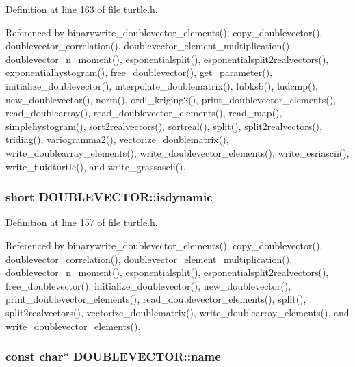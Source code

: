 Definition at line 163 of file turtle.\-h.



Referenced by binarywrite\-\_\-doublevector\-\_\-elements(), copy\-\_\-doublevector(), doublevector\-\_\-correlation(), doublevector\-\_\-element\-\_\-multiplication(), doublevector\-\_\-n\-\_\-moment(), esponentialsplit(), esponentialsplit2realvectors(), exponentialhystogram(), free\-\_\-doublevector(), get\-\_\-parameter(), initialize\-\_\-doublevector(), interpolate\-\_\-doublematrix(), lubksb(), ludcmp(), new\-\_\-doublevector(), norm(), ordi\-\_\-kriging2(), print\-\_\-doublevector\-\_\-elements(), read\-\_\-doublearray(), read\-\_\-doublevector\-\_\-elements(), read\-\_\-map(), simplehystogram(), sort2realvectors(), sortreal(), split(), split2realvectors(), tridiag(), variogramma2(), vectorize\-\_\-doublematrix(), write\-\_\-doublearray\-\_\-elements(), write\-\_\-doublevector\-\_\-elements(), write\-\_\-esriascii(), write\-\_\-fluidturtle(), and write\-\_\-grassascii().

\hypertarget{struct_d_o_u_b_l_e_v_e_c_t_o_r_ac88bf29d0bc7971cda775ab09b221467}{
\subsubsection[{isdynamic}]{\setlength{\rightskip}{0pt plus 5cm}short D\-O\-U\-B\-L\-E\-V\-E\-C\-T\-O\-R\-::isdynamic}}\label{struct_d_o_u_b_l_e_v_e_c_t_o_r_ac88bf29d0bc7971cda775ab09b221467}


Definition at line 157 of file turtle.\-h.



Referenced by binarywrite\-\_\-doublevector\-\_\-elements(), copy\-\_\-doublevector(), doublevector\-\_\-correlation(), doublevector\-\_\-element\-\_\-multiplication(), doublevector\-\_\-n\-\_\-moment(), esponentialsplit(), esponentialsplit2realvectors(), free\-\_\-doublevector(), initialize\-\_\-doublevector(), new\-\_\-doublevector(), print\-\_\-doublevector\-\_\-elements(), read\-\_\-doublevector\-\_\-elements(), split(), split2realvectors(), vectorize\-\_\-doublematrix(), write\-\_\-doublearray\-\_\-elements(), and write\-\_\-doublevector\-\_\-elements().

\hypertarget{struct_d_o_u_b_l_e_v_e_c_t_o_r_a4a57e36648cfefcec7ed33528e2547b1}{
\subsubsection[{name}]{\setlength{\rightskip}{0pt plus 5cm}const char$\ast$ D\-O\-U\-B\-L\-E\-V\-E\-C\-T\-O\-R\-::name}}\label{struct_d_o_u_b_l_e_v_e_c_t_o_r_a4a57e36648cfefcec7ed33528e2547b1}


